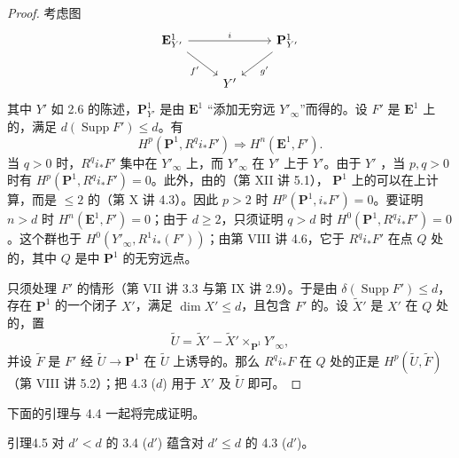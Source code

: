 \begin{proof}
考虑图
\[
\begin{tikzcd}
\mathbf E_{Y'}^1\arrow[rr,"i"]\arrow[dr,"f'"']&&\mathbf P_{Y'}^1\arrow[dl,"g'"]\\
&Y'&
\end{tikzcd}
\]
其中 $Y'$ 如 2.6 的陈述，$\mathbf P_{Y'}^1$ 是由 $\mathbf E^1$ “添加无穷远 $Y'_\infty$”而得的。设 $F'$ 是 $\mathbf E^1$ 上的，满足 $d(\operatorname{Supp}F')\leq d$。有
\[
H^p(\mathbf P^1,R^qi_*F')\Longrightarrow H^n(\mathbf E^1,F').
\]
当 $q>0$ 时，$R^qi_*F'$ 集中在 $Y'_\infty$ 上，而 $Y'_\infty$ 在 $Y'$ 上于 $Y'$。由于 $Y'$ ，当 $p,q>0$ 时有 $H^p(\mathbf P^1,R^qi_*F')=0$。此外，由的（第 XII 讲 5.1），
$\mathbf P^1$ 上的可以在上计算，而是 $\leq2$ 的（第 X 讲 4.3）。因此 $p>2$ 时 $H^p(\mathbf P^1,i_*F')=0$。要证明 $n>d$ 时 $H^n(\mathbf E^1,F')=0$；由于 $d\geq2$，只须证明 $q>d$ 时 $H^0(\mathbf P^1,R^qi_*F')=0$。这个群也于 $H^0(Y'_\infty,R^1i_*(F'))$；由第 VIII 讲 4.6，它于 $R^qi_*F'$ 在点 $Q$ 处的，其中 $Q$ 是中 $\mathbf P^1$ 的无穷远点。

只须处理 $F'$ 的情形（第 VII 讲 3.3 与第 IX 讲 2.9）。于是由 $\delta(\operatorname{Supp}F')\leq d$，存在 $\mathbf P^1$ 的一个闭子 $X'$，满足 $\dim X'\leq d$，且包含 $F'$ 的。设 $\widetilde X'$ 是 $X'$ 在 $Q$ 处的，置
\[
\widetilde U=\widetilde X'-\widetilde X'\times_{\mathbf P^1}Y'_\infty,
\]
并设 $\widetilde F$ 是 $F'$ 经 $\widetilde U\to\mathbf P^1$ 在 $\widetilde U$ 上诱导的。那么 $R^qi_*F$ 在 $Q$ 处的正是 $H^p(\widetilde U,\widetilde F)$（第 VIII 讲 5.2）；把 4.3 ($d$) 用于 $X'$ 及 $\widetilde U$ 即可。
\end{proof}
下面的引理与 4.4 一起将完成证明。
\begin{SGAresult}{引理}{4.5}
对 $d'<d$ 的 3.4 ($d'$) 蕴含对 $d'\leq d$ 的 4.3 ($d'$)。
\end{SGAresult}

